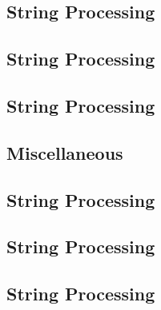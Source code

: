 \vspace{0.1\baselineskip}\subsection{String Processing}
\raggedbottom
\vspace{-.7\baselineskip}\hrulefill
\vspace{0.1\baselineskip}\subsection{String Processing}
\raggedbottom
\vspace{-.7\baselineskip}\hrulefill
\vspace{0.1\baselineskip}\subsection{String Processing}
\raggedbottom
\vspace{-.7\baselineskip}\hrulefill
\vspace{0.1\baselineskip}\subsection{Miscellaneous}
\raggedbottom
\vspace{-.7\baselineskip}\hrulefill
\vspace{0.1\baselineskip}\subsection{String Processing}
\raggedbottom
\vspace{-.7\baselineskip}\hrulefill
\vspace{0.1\baselineskip}\subsection{String Processing}
\raggedbottom
\vspace{-.7\baselineskip}\hrulefill
\vspace{0.1\baselineskip}\subsection{String Processing}

